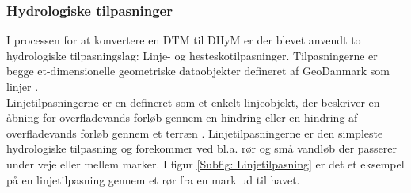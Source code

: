 \subsubsection{Hydrologiske tilpasninger} \label{Afsnit: Hydrologiske tilpasninger}
I processen for at konvertere en DTM til DHyM er der blevet anvendt to hydrologiske tilpasningslag: Linje- og hesteskotilpasninger. Tilpasningerne er begge et-dimensionelle geometriske dataobjekter defineret af GeoDanmark som linjer \citep{GeoDanmark_HydroLag}. \\
Linjetilpasningerne er en defineret som et enkelt linjeobjekt, der beskriver en åbning for overfladevands forløb gennem en hindring eller en hindring af overfladevands forløb gennem et terræn \citep{DHMLinje}. 
Linjetilpasningerne er den simpleste hydrologiske tilpasning og forekommer ved bl.a. rør og små vandløb der passerer under veje eller mellem marker. I figur \ref{Subfig: Linjetilpasning} er det et eksempel på en linjetilpasning gennem et rør fra en mark ud til havet.\\

